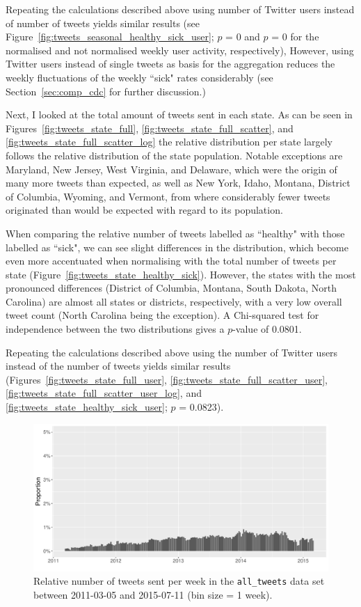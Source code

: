 \documentclass[11pt, a4paper,twoside]{report}\usepackage[]{graphicx}\usepackage[]{color}
\begin{document}
Repeating the calculations described above using number of Twitter users instead of number of tweets yields similar results (see Figure~\ref{fig:tweets_seasonal_healthy_sick_user}; $p$ = 0 and $p$ = 0 for the normalised and not normalised weekly user activity, respectively), However, using Twitter users instead of single tweets as basis for the aggregation reduces the weekly fluctuations of the weekly ``sick" rates considerably (see Section~\ref{sec:comp_cdc} for further discussion.)

Next, I looked at the total amount of tweets sent in each state. As can be seen in Figures~\ref{fig:tweets_state_full}, \ref{fig:tweets_state_full_scatter}, and \ref{fig:tweets_state_full_scatter_log} the relative distribution per state largely follows the relative distribution of the state population. Notable exceptions are Maryland, New Jersey, West Virginia, and Delaware, which were the origin of many more tweets than expected, as well as New York, Idaho, Montana, District of Columbia, Wyoming, and Vermont, from where considerably fewer tweets originated than would be expected with regard to its population.

When comparing the relative number of tweets labelled as ``healthy" with those labelled as ``sick", we can see slight differences in the distribution, which become even more accentuated when normalising with the total number of tweets per state (Figure~\ref{fig:tweets_state_healthy_sick}). However, the states with the most pronounced differences (District of Columbia, Montana, South Dakota, North Carolina) are almost all states or districts, respectively, with a very low overall tweet count (North Carolina being the exception). A Chi-squared test for independence between the two distributions gives a $p$-value of 0.0801. 

Repeating the calculations described above using the number of Twitter users instead of the number of tweets yields similar results (Figures~\ref{fig:tweets_state_full_user}, \ref{fig:tweets_state_full_scatter_user}, \ref{fig:tweets_state_full_scatter_user_log}, and \ref{fig:tweets_state_healthy_sick_user}; $p$ = 0.0823).

\begin{figure}[htbp!]
\centering
\includegraphics[width=1\linewidth]{11_activity_total_date_Twitter_full_aggregated.pdf}
\caption{Relative number of tweets sent per week in the \texttt{all\_tweets} data set between 2011-03-05 and 2015-07-11 (bin size = 1 week).}
\label{fig:tweets_seasonal_full}
\end{figure}
\end{document}
